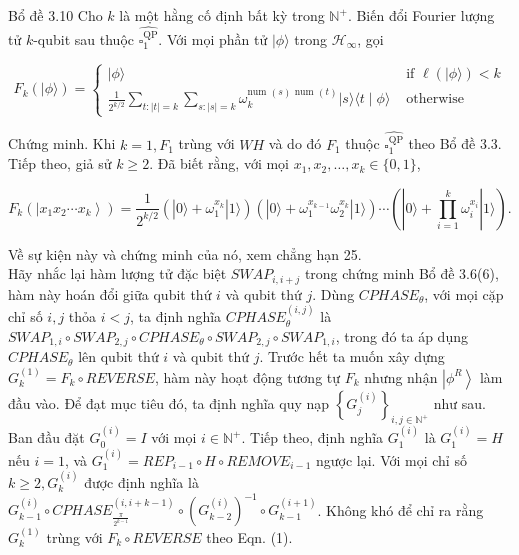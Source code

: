 \documentclass[10pt]{article}
\begin{document}
Bổ đề 3.10 Cho $k$ là một hằng cố định bất kỳ trong $\mathbb{N}^{+}$. Biến đổi Fourier lượng tử $k$-qubit sau thuộc $\widehat{\square_{1}^{\mathrm{QP}}}$. Với mọi phần tử $|\phi\rangle$ trong $\mathcal{H}_{\infty}$, gọi

$$
F_{k}(|\phi\rangle)= \begin{cases}|\phi\rangle & \text { if } \ell(|\phi\rangle)<k \\ \frac{1}{2^{k / 2}} \sum_{t:|t|=k} \sum_{s:|s|=k} \omega_{k}^{\text {num }(s) \text { num }(t)}|s\rangle\langle t \mid \phi\rangle & \text { otherwise }\end{cases}
$$

Chứng minh. Khi $k=1, F_{1}$ trùng với $W H$ và do đó $F_{1}$ thuộc $\widehat{\square_{1}^{\mathrm{QP}}}$ theo Bổ đề 3.3. Tiếp theo, giả sử $k \geq 2$. Đã biết rằng, với mọi $x_{1}, x_{2}, \ldots, x_{k} \in\{0,1\}$,

\begin{equation*}
F_{k}\left(\left|x_{1} x_{2} \cdots x_{k}\right\rangle\right)=\frac{1}{2^{k / 2}}\left(|0\rangle+\omega_{1}^{x_{k}}|1\rangle\right)\left(|0\rangle+\omega_{1}^{x_{k-1}} \omega_{2}^{x_{k}}|1\rangle\right) \cdots\left(|0\rangle+\prod_{i=1}^{k} \omega_{i}^{x_{i}}|1\rangle\right) . \tag{1}
\end{equation*}

Về sự kiện này và chứng minh của nó, xem chẳng hạn 25.\\
Hãy nhắc lại hàm lượng tử đặc biệt $S W A P_{i, i+j}$ trong chứng minh Bổ đề 3.6(6), hàm này hoán đổi giữa qubit thứ $i$ và qubit thứ $j$. Dùng $C P H A S E_{\theta}$, với mọi cặp chỉ số $i, j$ thỏa $i<j$, ta định nghĩa $C P H A S E_{\theta}^{(i, j)}$ là $S W A P_{1, i} \circ S W A P_{2, j} \circ C P H A S E_{\theta} \circ S W A P_{2, j} \circ S W A P_{1, i}$, trong đó ta áp dụng $C P H A S E_{\theta}$ lên qubit thứ $i$ và qubit thứ $j$. Trước hết ta muốn xây dựng $G_{k}^{(1)}=F_{k} \circ R E V E R S E$, hàm này hoạt động tương tự $F_{k}$ nhưng nhận $\left|\phi^{R}\right\rangle$ làm đầu vào. Để đạt mục tiêu đó, ta định nghĩa quy nạp $\left\{G_{j}^{(i)}\right\}_{i, j \in \mathbb{N}^{+}}$ như sau. Ban đầu đặt $G_{0}^{(i)}=I$ với mọi $i \in \mathbb{N}^{+}$. Tiếp theo, định nghĩa $G_{1}^{(i)}$ là $G_{1}^{(i)}=H$ nếu $i=1$, và $G_{1}^{(i)}= R E P_{i-1} \circ H \circ R E M O V E_{i-1}$ ngược lại. Với mọi chỉ số $k \geq 2, G_{k}^{(i)}$ được định nghĩa là $G_{k-1}^{(i)} \circ C P H A S E_{\frac{\pi}{2^{k-1}}}^{(i, i+k-1)} \circ \left(G_{k-2}^{(i)}\right)^{-1} \circ G_{k-1}^{(i+1)}$. Không khó để chỉ ra rằng $G_{k}^{(1)}$ trùng với $F_{k} \circ R E V E R S E$ theo Eqn. (1).
\end{document}
